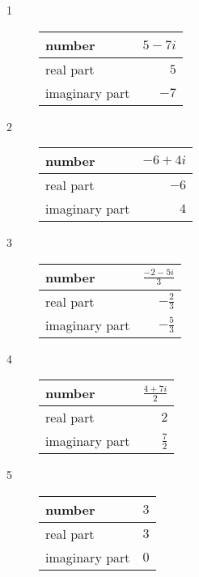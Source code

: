 \documentclass{exam}
\begin{document}
  \begin{description}
    \item[1] 
      \begin{tabular}{lr}
        \toprule
        number         & $5 - 7i$ \\
        \midrule
        real part      & $5$ \\
        \midrule
        imaginary part & $-7$ \\
        \midrule
        \bottomrule
      \end{tabular}

    \item[2] 
      \begin{tabular}{lr}
        \toprule
        number         & $-6 + 4i$ \\
        \midrule
        real part      & $-6$ \\
        \midrule
        imaginary part & $4$ \\
        \bottomrule
      \end{tabular}

    \item[3]
      \begin{tabular}{lr}
        \toprule
        number         & $\frac{-2 - 5i}{3}$ \\
        \midrule
        real part      & $- \frac{2}{3}$ \\
        \midrule
        imaginary part & $- \frac{5}{3}$ \\
        \bottomrule
      \end{tabular}

    \item[4]
      \begin{tabular}{lr}
        \toprule
        number         & $\frac{4 + 7i}{2}$ \\
        \midrule
        real part      & $2$ \\
        \midrule
        imaginary part & $\frac{7}{2}$ \\
        \bottomrule
      \end{tabular}

    \item[5]
      \begin{tabular}{lr}
        \toprule
        number         & $3$ \\
        \midrule
        real part      & $3$ \\
        \midrule
        imaginary part & $0$ \\
        \bottomrule
      \end{tabular}


\end{description}
\end{document}
